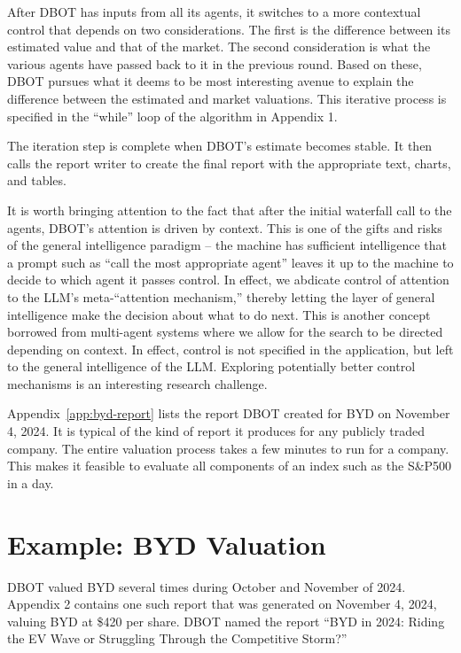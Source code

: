 \documentclass[]{interact}
\theoremstyle{plain}%
\theoremstyle{definition}
\theoremstyle{remark}
\begin{document}
After DBOT has inputs from all its agents, it switches to a more contextual control that depends on two considerations. The first is the difference between its estimated value and that of the market. The second consideration is what the various agents have passed back to it in the previous round. Based on these, DBOT pursues what it deems to be most interesting avenue to explain the difference between the estimated and market valuations. This iterative process is specified in the ``while'' loop of the algorithm in Appendix 1. 

The iteration step is complete when DBOT’s estimate becomes stable. It then calls the report writer to create the final report with the appropriate text, charts, and tables. 

It is worth bringing attention to the fact that after the initial waterfall call to the agents, DBOT's attention is driven by context. This is one of the gifts and risks of the general intelligence paradigm – the machine has sufficient intelligence that a prompt such as “call the most appropriate agent” leaves it up to the machine to decide to which agent it passes control. In effect, we abdicate control of attention to the LLM’s meta-“attention mechanism,” thereby letting the layer of general intelligence make the decision about what to do next. This is another concept borrowed from multi-agent systems where we allow for the search to be directed depending on context. In effect, control is not specified in the application, but left to the general intelligence of the LLM. Exploring potentially better control mechanisms is an interesting research challenge.

Appendix~\ref{app:byd-report} lists the report DBOT created for BYD on November 4, 2024. It is typical of the kind of report it produces for any publicly traded company. The entire valuation process takes a few minutes to run for a company. This makes it feasible to evaluate all components of an index such as the S\&P500 in a day.

\section{Example: BYD Valuation}
DBOT valued BYD several times during October and November of 2024. Appendix 2 contains one such report that was generated on November 4, 2024, valuing BYD at \$420 per share. DBOT named the report “BYD in 2024: Riding the EV Wave or Struggling Through the Competitive Storm?” 
\end{document}
